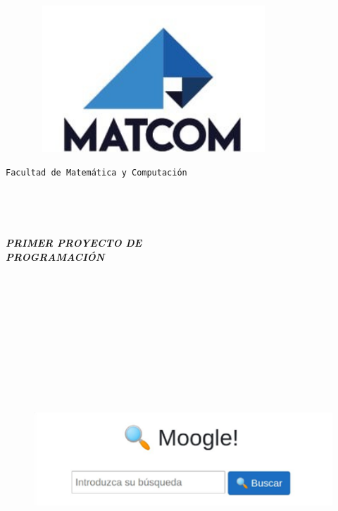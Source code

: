 \documentclass{article}
\begin{document}
\begin{figure}[t]
	\begin{center}
		\includegraphics[width=9cm, height=5.5cm]{img0.jpg}
	\end{center}
\end{figure}

\begin{center}
    {\large\texttt{Facultad de Matemática y Computación}}
\end{center}


\ 


\


\begin{center}
   \textbf{\emph{\Huge{PRIMER PROYECTO DE\\ PROGRAMACIÓN}}}
\end{center}


\ 


\ 


\


\ 


\ 


\begin{center}
	\begin{figure}[h]
		\begin{center}
			\includegraphics[width=15cm, height=5cm]{img1.png}
		\end{center}
	\end{figure}

\end{center}
\end{document}

